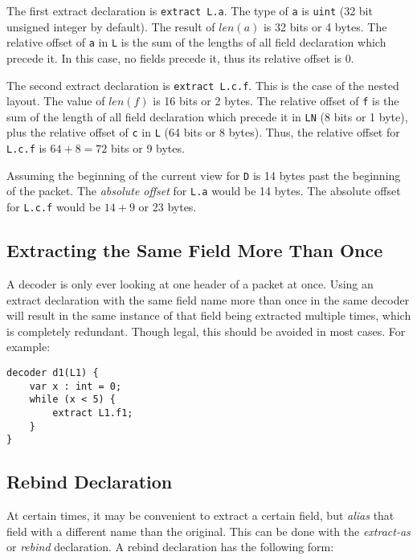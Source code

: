 The first extract declaration is \texttt{extract L.a}. The type of \texttt{a} is \texttt{uint} (32 bit unsigned integer by default). The result of $len(a)$ is 32 bits or 4 bytes. The relative offset of \texttt{a} in \texttt{L} is the sum of the lengths of all field declaration which precede it. In this case, no fields precede it, thus its relative offset is 0.

The second extract declaration is \texttt{extract L.c.f}. This is the case of the nested layout. The value of $len(f)$ is 16 bits or 2 bytes. The relative offset of \texttt{f} is the sum of the length of all field declaration which precede it in \texttt{LN} (8 bits or 1 byte), plus the relative offset of \texttt{c} in \texttt{L} (64 bits or 8 bytes). Thus, the relative offset for \texttt{L.c.f} is $64+8=72$ bits or 9 bytes.

Assuming the beginning of the current view for \texttt{D} is 14 bytes past the beginning of the packet. The \textit{absolute offset} for \texttt{L.a} would be 14 bytes. The absolute offset for \texttt{L.c.f} would be $14+9$ or 23 bytes.

\subsection{Extracting the Same Field More Than Once}

A decoder is only ever looking at one header of a packet at once. Using an extract declaration with the same field name more than once in the same decoder will result in the same instance of that field being extracted multiple times, which is completely redundant. Though legal, this should be avoided in most cases. For example: 

\begin{minip}
\begin{lstlisting}
decoder d1(L1) {
	var x : int = 0; 	
	while (x < 5) {
		extract L1.f1;
	}
}
\end{lstlisting}
\end{minip}

\subsection{Rebind Declaration} \label{guide:rebind}

At certain times, it may be convenient to extract a certain field, but \textit{alias} that field with a different name than the original. This can be done with the \textit{extract-as} or \textit{rebind} declaration. A rebind declaration has the following form:

